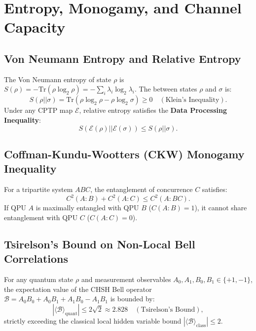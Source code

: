 \section{Entropy, Monogamy, and Channel Capacity}
\label{sec:app_entanglement_monogamy}

\subsection{Von Neumann Entropy and Relative Entropy}
The Von Neumann entropy of state $\rho$ is $S(\rho) = -\text{Tr}(\rho \log_2 \rho) = -\sum_i \lambda_i \log_2 \lambda_i$.
The  between states $\rho$ and $\sigma$ is:
\begin{equation}
    S(\rho || \sigma) = \text{Tr}\left(\rho \log_2 \rho - \rho \log_2 \sigma\right) \ge 0 \quad (\text{Klein's Inequality}).
\end{equation}
Under any CPTP map $\mathcal{E}$, relative entropy satisfies the \textbf{Data Processing Inequality}:
\begin{equation}
    S(\mathcal{E}(\rho) || \mathcal{E}(\sigma)) \le S(\rho || \sigma).
\end{equation}

\subsection{Coffman-Kundu-Wootters (CKW) Monogamy Inequality}
For a tripartite system $ABC$, the entanglement of concurrence $C$ satisfies:
\begin{equation}
    C^2(A:B) + C^2(A:C) \le C^2(A:BC).
    \label{eq:ckw_monogamy_v2}
\end{equation}
If QPU $A$ is maximally entangled with QPU $B$ ($C(A:B) = 1$), it cannot share entanglement with QPU $C$ ($C(A:C) = 0$).

\subsection{Tsirelson's Bound on Non-Local Bell Correlations}
For any quantum state $\rho$ and measurement observables $A_0, A_1, B_0, B_1 \in \{+1, -1\}$, the expectation value of the CHSH Bell operator $\mathcal{B} = A_0 B_0 + A_0 B_1 + A_1 B_0 - A_1 B_1$ is bounded by:
\begin{equation}
    |\langle \mathcal{B} \rangle_{\text{quant}}| \le 2\sqrt{2} \approx 2.828 \quad (\text{Tsirelson's Bound}),
\end{equation}
strictly exceeding the classical local hidden variable bound $|\langle \mathcal{B} \rangle_{\text{class}}| \le 2$.

